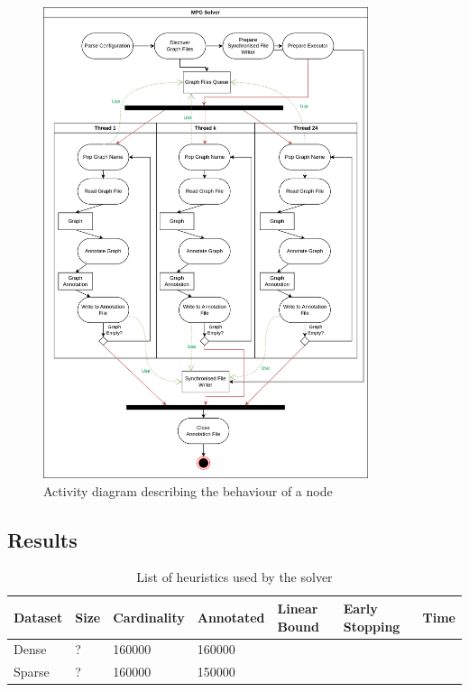 \begin{figure}[H]
	\centering
	\includegraphics[width=0.85\textwidth]{Figures/AnnotationThreads.png}
	\caption{Activity diagram describing the behaviour of a node
		\label{fig:HPCAnnotationProcess}}
\end{figure}
\FloatBarrier
\newpage
\subsection{Results}
\begin{table}[h]
	\small
	\begin{tabularx}{\textwidth}{| p{1.5cm} | p{1.2cm} | p{2cm} | p{2cm} | X | X | X |}
		\hline
		
		Dataset & Size & Cardinality & Annotated & Linear Bound & Early Stopping & Time  \\
		\hline
		Dense & ? & 160000 & 160000 &\cmark &  \cmark & \\	
		\hline
		Sparse & ? & 160000& 150000  & \cmark &  \xmark & \\	
		\hline
	\end{tabularx}
	\caption{List of heuristics used by the solver
		\label{table:SolverResults}}
\end{table}
\FloatBarrier